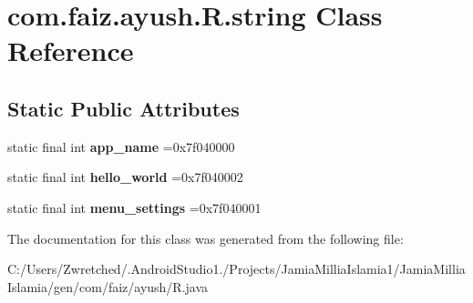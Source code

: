 \hypertarget{classcom_1_1faiz_1_1ayush_1_1_r_1_1string}{}\section{com.\+faiz.\+ayush.\+R.\+string Class Reference}
\label{classcom_1_1faiz_1_1ayush_1_1_r_1_1string}
\subsection*{Static Public Attributes}
\begin{DoxyCompactItemize}
\item 
\hypertarget{classcom_1_1faiz_1_1ayush_1_1_r_1_1string_a1f8c7302622f92583d22d1679e6fc945}{}static final int {\bfseries app\+\_\+name} =0x7f040000\label{classcom_1_1faiz_1_1ayush_1_1_r_1_1string_a1f8c7302622f92583d22d1679e6fc945}

\item 
\hypertarget{classcom_1_1faiz_1_1ayush_1_1_r_1_1string_a07d170b87a7e7457d8e30ab50ec5bca6}{}static final int {\bfseries hello\+\_\+world} =0x7f040002\label{classcom_1_1faiz_1_1ayush_1_1_r_1_1string_a07d170b87a7e7457d8e30ab50ec5bca6}

\item 
\hypertarget{classcom_1_1faiz_1_1ayush_1_1_r_1_1string_a0798533d2b695b6d6a5342394c4bd207}{}static final int {\bfseries menu\+\_\+settings} =0x7f040001\label{classcom_1_1faiz_1_1ayush_1_1_r_1_1string_a0798533d2b695b6d6a5342394c4bd207}

\end{DoxyCompactItemize}


The documentation for this class was generated from the following file\+:\begin{DoxyCompactItemize}
\item 
C\+:/\+Users/\+Zwretched/.\+Android\+Studio1./\+Projects/\+Jamia\+Millia\+Islamia1/\+Jamia\+Millia\+Islamia/gen/com/faiz/ayush/R.\+java\end{DoxyCompactItemize}
